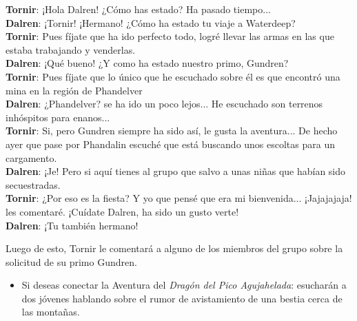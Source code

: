 \documentclass[10pt,twoside,twocolumn,openany]{dndbook}
\begin{document}
\begin{DndReadAloud}
  \textbf{Tornir}: ¡Hola Dalren! ¿Cómo has estado? Ha pasado tiempo... \\
  \textbf{Dalren}: ¡Tornir! ¡Hermano! ¿Cómo ha estado tu viaje a Waterdeep? \\
  \textbf{Tornir}: Pues fíjate que ha ido perfecto todo, logré llevar las armas en las que estaba 
  trabajando y venderlas. \\
  \textbf{Dalren}: ¡Qué bueno! ¿Y como ha estado nuestro primo, Gundren? \\
  \textbf{Tornir}: Pues fíjate que lo único que he escuchado sobre él es que encontró una mina 
  en la región de Phandelver \\
  \textbf{Dalren}: ¿Phandelver? se ha ido un poco lejos... He escuchado son terrenos inhóspitos
  para enanos... \\
  \textbf{Tornir}: Si, pero Gundren siempre ha sido así, le gusta la aventura... De hecho ayer 
  que pase por Phandalin escuché que está buscando unos escoltas para un cargamento. \\
  \textbf{Dalren}: ¡Je! Pero si aquí tienes al grupo que salvo a unas niñas que habían sido 
  secuestradas. \\
  \textbf{Tornir}: ¿Por eso es la fiesta? Y yo que pensé que era mi bienvenida... ¡Jajajajaja! les 
  comentaré. ¡Cuídate Dalren, ha sido un gusto verte! \\
  \textbf{Dalren}: ¡Tu también hermano! \\
\end{DndReadAloud}

Luego de esto, Tornir le comentará a alguno de los miembros del grupo sobre la solicitud de 
su primo Gundren.

\begin{itemize}
  \item Si deseas conectar la Aventura del \emph{Dragón del Pico Agujahelada}: esucharán a dos 
  jóvenes hablando sobre el rumor de avistamiento de una bestia cerca de las montañas.
\end{itemize} 
\end{document}
